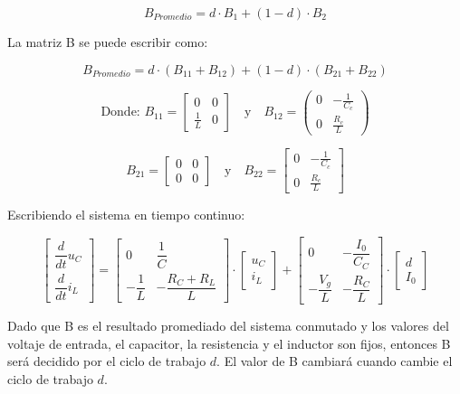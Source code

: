 \begin{equation}
    B_{Promedio} = d \cdot B_1 + (1 - d) \cdot B_2
\end{equation}

La matriz B se puede escribir como:

\begin{equation}
    B_{Promedio} = d \cdot (B_11 + B_12) + (1 - d) \cdot (B_21 + B_22)
\end{equation}

\[
\text{Donde: } B_{11} = \begin{bmatrix}
0 & 0 \\
\frac{1}{L} & 0
\end{bmatrix}
\quad \text{y} \quad
B_{12} = \begin{pmatrix}
0 & -\frac{1}{C_c} \\
0 & \frac{R_c}{L}
\end{pmatrix}
\]

\[
B_{21} = \begin{bmatrix}
0 & 0 \\
0 & 0
\end{bmatrix}
\quad \text{y} \quad
B_{22} = \begin{bmatrix}
0 & -\frac{1}{C_c} \\
0 & \frac{R_c}{L}
\end{bmatrix}
\]

Escribiendo el sistema en tiempo continuo:

\begin{equation}
    \begin{bmatrix}
        \dfrac{d}{dt}u_C\\
        \dfrac{d}{dt}i_L
    \end{bmatrix}
    =
    \begin{bmatrix}
        0 & \dfrac{1}{C}\\
        -\dfrac{1}{L} & -\dfrac{R_C + R_L}{L}
    \end{bmatrix}
    \cdot
    \begin{bmatrix}
        u_C\\
        i_L
    \end{bmatrix}
    +
    \begin{bmatrix}
        0 & -\dfrac{I_0}{C_C}\\
        -\dfrac{V_g}{L} & -\dfrac{R_C}{L}
    \end{bmatrix}
    \cdot
    \begin{bmatrix}
        d\\
        I_0
    \end{bmatrix} 
\end{equation}

Dado que B es el resultado promediado del sistema conmutado y los valores del voltaje de entrada,
el capacitor, la resistencia y el inductor son fijos, entonces B será decidido por el ciclo de
trabajo $d$. El valor de B cambiará cuando cambie el ciclo de trabajo $d$.
